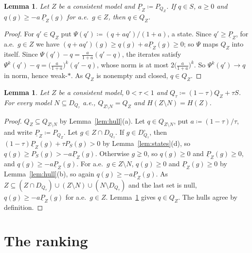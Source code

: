 \documentclass[11pt]{article}
\newtheorem{lemma}[theorem]{Lemma}
\theoremstyle{definition}
\begin{document}
\begin{lemma}\label{lem:contraction}
Let $Z$ be a consistent model and $\underline P_Z\coloneqq P_{Q_Z}$. If $q\in S$, $a\ge0$ and $q(g)\ge-a\,\underline P_Z(g)$ for a.e.\ $g\in Z$, then $q\in Q_Z$.
\end{lemma}
\begin{proof}
For $q'\in Q_Z$ put $\Psi(q')\coloneqq(q+aq')/(1+a)$, a state. Since $q'\ge\underline P_Z$, for a.e.\ $g\in Z$ we have $(q+aq')(g)\ge q(g)+a\underline P_Z(g)\ge0$; so $\Psi$ maps $Q_Z$ into itself. Since $\Psi(q')-q=\frac a{1+a}(q'-q)$, the iterates satisfy $\Psi^k(q')-q=\bigl(\frac a{1+a}\bigr)^k(q'-q)$, whose norm is at most $2\bigl(\frac a{1+a}\bigr)^k$. So $\Psi^k(q')\to q$ in norm, hence weak-$\ast$. As $Q_Z$ is nonempty and closed, $q\in Q_Z$.
\end{proof}

\begin{lemma}\label{lem:trim}
Let $Z$ be a consistent model, $0<\tau<1$ and $Q_\tau\coloneqq(1-\tau)Q_Z+\tau S$. For every model $N\subseteq D_{Q_\tau}$ a.e., $Q_{Z\setminus N}=Q_Z$ and $H(Z\setminus N)=H(Z)$.
\end{lemma}
\begin{proof}
$Q_Z\subseteq Q_{Z\setminus N}$ by Lemma~\ref{lem:hull}(a). Let $q\in Q_{Z\setminus N}$, put $a\coloneqq(1-\tau)/\tau$, and write $\underline P_Z\coloneqq P_{Q_Z}$. Let $g\in Z\cap D_{Q_\tau}$. If $g\in D^\circ_{Q_\tau}$, then $(1-\tau)\underline P_Z(g)+\tau P_S(g)>0$ by Lemma~\ref{lem:states}(d), so $q(g)\ge P_S(g)>-a\underline P_Z(g)$. Otherwise $g\gneq0$, so $q(g)\ge0$ and $\underline P_Z(g)\ge0$, and $q(g)\ge-a\underline P_Z(g)$. For a.e.\ $g\in Z\setminus N$, $q(g)\ge0$ and $\underline P_Z(g)\ge0$ by Lemma~\ref{lem:hull}(b), so again $q(g)\ge-a\underline P_Z(g)$. As $Z\subseteq(Z\cap D_{Q_\tau})\cup(Z\setminus N)\cup(N\setminus D_{Q_\tau})$ and the last set is null, $q(g)\ge-a\underline P_Z(g)$ for a.e.\ $g\in Z$. Lemma~\ref{lem:contraction} gives $q\in Q_Z$. The hulls agree by definition.
\end{proof}

\section{The ranking}\label{sec:ranking}
\end{document}
